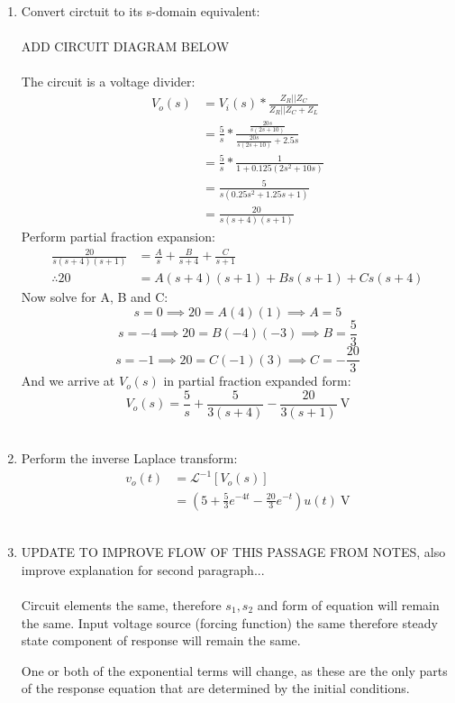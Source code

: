 \begin{enumerate}
	\item{
		Convert circtuit to its s-domain equivalent:
		\\ \\
		ADD CIRCUIT DIAGRAM BELOW
		\\ \\
		The circuit is a voltage divider:
		\begin{align*}
			V_o(s) &= V_i(s) * \frac{Z_R || Z_C}{Z_R || Z_C + Z_L} \\
			&= \frac{5}{s} * \frac{\frac{20s}{s(2s+10)}}{\frac{20s}{s(2s+10)}+2.5s} \\
			&= \frac{5}{s} * \frac{1}{1+0.125(2s^2+10s)} \\
			&= \frac{5}{s(0.25s^2+1.25s+1)} \\
			&= \frac{20}{s(s+4)(s+1)}
		\end{align*}
		Perform partial fraction expansion:
		\begin{align*}
			\frac{20}{s(s+4)(s+1)} &= \frac{A}{s} + \frac{B}{s+4} + \frac{C}{s+1} \\
			\therefore 20 &= A(s+4)(s+1) + Bs(s+1) + Cs(s+4)
		\end{align*}
		Now solve for A, B and C:
		\begin{equation*}
			s = 0 \implies 20 = A(4)(1) \implies A = 5
		\end{equation*}
		\begin{equation*}
			s = -4 \implies 20 = B(-4)(-3) \implies B = \frac{5}{3}
		\end{equation*}
		\begin{equation*}
			s = -1 \implies 20 = C(-1)(3) \implies C = -\frac{20}{3}
		\end{equation*}
		And we arrive at $V_o(s)$ in partial fraction expanded form:
		\begin{equation*}
			V_o(s) = \frac{5}{s} + \frac{5}{3(s+4)} - \frac{20}{3(s+1)} \ \mathrm{V}
		\end{equation*}
		\\
	}

	\item{
		Perform the inverse Laplace transform:
		\begin{align*}
			v_o(t) &= \mathcal{L}^{-1}\left[ V_o(s) \right] \\
			&= \left(5 + \frac{5}{3}e^{-4t} - \frac{20}{3}e^{-t} \right) u(t) \ \mathrm{V}
		\end{align*}
		\\
	}

	\item{
		UPDATE TO IMPROVE FLOW OF THIS PASSAGE FROM NOTES, also improve explanation for second paragraph...
		\\ \\
		Circuit elements the same, therefore $s_1, s_2$ and form of equation will remain the same. Input voltage source (forcing function) the same therefore steady state component of response will remain the same.
		\par
		One or both of the exponential terms will change, as these are the only parts of the response equation that are determined by the initial conditions.
	}
\end{enumerate}
